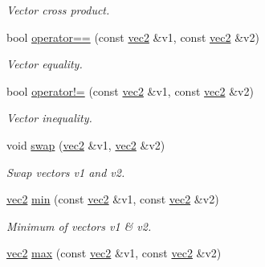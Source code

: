 \begin{DoxyCompactItemize}
\begin{DoxyCompactList}\small\item\em \-Vector cross product. \end{DoxyCompactList}\item 
\hypertarget{classutil_1_1math_1_1vec2_a0f20d5eff5576157b355c3e4256dafc7}{bool \hyperlink{classutil_1_1math_1_1vec2_a0f20d5eff5576157b355c3e4256dafc7}{operator==} (const \hyperlink{classutil_1_1math_1_1vec2}{vec2} \&v1, const \hyperlink{classutil_1_1math_1_1vec2}{vec2} \&v2)}\label{classutil_1_1math_1_1vec2_a0f20d5eff5576157b355c3e4256dafc7}

\begin{DoxyCompactList}\small\item\em \-Vector equality. \end{DoxyCompactList}\item 
\hypertarget{classutil_1_1math_1_1vec2_ab8bee146ca4567b7bf5deb7276b54d08}{bool \hyperlink{classutil_1_1math_1_1vec2_ab8bee146ca4567b7bf5deb7276b54d08}{operator!=} (const \hyperlink{classutil_1_1math_1_1vec2}{vec2} \&v1, const \hyperlink{classutil_1_1math_1_1vec2}{vec2} \&v2)}\label{classutil_1_1math_1_1vec2_ab8bee146ca4567b7bf5deb7276b54d08}

\begin{DoxyCompactList}\small\item\em \-Vector inequality. \end{DoxyCompactList}\item 
\hypertarget{classutil_1_1math_1_1vec2_adea6024eac5b48729c1e9149c98d0158}{void \hyperlink{classutil_1_1math_1_1vec2_adea6024eac5b48729c1e9149c98d0158}{swap} (\hyperlink{classutil_1_1math_1_1vec2}{vec2} \&v1, \hyperlink{classutil_1_1math_1_1vec2}{vec2} \&v2)}\label{classutil_1_1math_1_1vec2_adea6024eac5b48729c1e9149c98d0158}

\begin{DoxyCompactList}\small\item\em \-Swap vectors v1 and v2. \end{DoxyCompactList}\item 
\hypertarget{classutil_1_1math_1_1vec2_a46ee1742ead8ea22dcb111bfb9fa40ab}{\hyperlink{classutil_1_1math_1_1vec2}{vec2} \hyperlink{classutil_1_1math_1_1vec2_a46ee1742ead8ea22dcb111bfb9fa40ab}{min} (const \hyperlink{classutil_1_1math_1_1vec2}{vec2} \&v1, const \hyperlink{classutil_1_1math_1_1vec2}{vec2} \&v2)}\label{classutil_1_1math_1_1vec2_a46ee1742ead8ea22dcb111bfb9fa40ab}

\begin{DoxyCompactList}\small\item\em \-Minimum of vectors v1 \& v2. \end{DoxyCompactList}\item 
\hypertarget{classutil_1_1math_1_1vec2_aa059546101199b29146ae8283cc0ae9a}{\hyperlink{classutil_1_1math_1_1vec2}{vec2} \hyperlink{classutil_1_1math_1_1vec2_aa059546101199b29146ae8283cc0ae9a}{max} (const \hyperlink{classutil_1_1math_1_1vec2}{vec2} \&v1, const \hyperlink{classutil_1_1math_1_1vec2}{vec2} \&v2)}\label{classutil_1_1math_1_1vec2_aa059546101199b29146ae8283cc0ae9a}


\end{DoxyCompactItemize}
